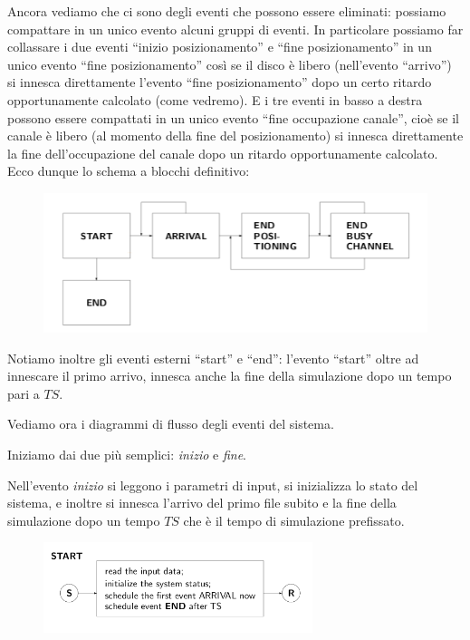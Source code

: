 \documentclass[11pt]{book}
\begin{document}
Ancora vediamo che ci sono degli eventi che possono essere eliminati:
possiamo compattare in un unico evento alcuni gruppi di eventi. In
particolare possiamo far collassare i due eventi ``inizio
posizionamento'' e ``fine posizionamento'' in un unico evento ``fine
posizionamento'' cos\`i se il disco \`e libero (nell'evento ``arrivo'')
si innesca direttamente l'evento ``fine posizionamento'' dopo un certo
ritardo opportunamente calcolato (come vedremo). E i tre eventi in
basso a destra possono essere compattati in un unico evento ``fine
occupazione canale'', cio\`e se il canale \`e libero (al momento della
fine del posizionamento) si innesca direttamente la fine
dell'occupazione del canale dopo un ritardo opportunamente
calcolato. Ecco dunque lo schema a blocchi definitivo:

\begin{figure}[H]
  \centering
  \includegraphics[width=\textwidth]{images/cap11fig27.png}
\end{figure}

Notiamo inoltre gli eventi esterni ``start'' e ``end'': l'evento
``start'' oltre ad innescare il primo arrivo, innesca anche la fine
della simulazione dopo un tempo pari a $TS$.

Vediamo ora i diagrammi di flusso degli eventi del sistema.

Iniziamo dai due pi\`u semplici: {\em inizio} e {\em fine}.

Nell'evento {\em inizio} si leggono i parametri di input, si
inizializza lo stato del sistema, e inoltre si innesca l'arrivo del
primo file subito e la fine della simulazione dopo un tempo $TS$ che
\`e il tempo di simulazione prefissato.

\begin{figure}[H]
  \centering
  \includegraphics[width=0.7\textwidth]{images/cap11fig28_1.png}
\end{figure}
\end{document}
